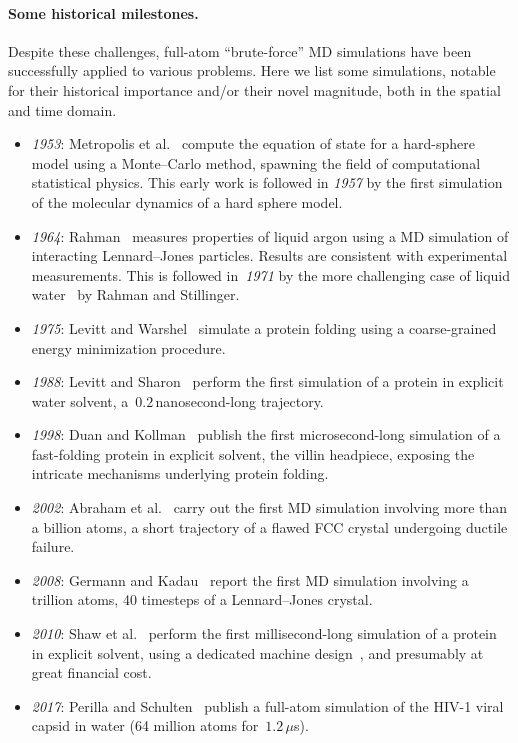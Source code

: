 \paragraph{Some historical milestones.}
\label{par:01:milestones}
Despite these challenges, full-atom ``brute-force'' MD simulations have been successfully applied to various problems. Here we list some simulations, notable for their historical importance and/or their novel magnitude, both in the spatial and time domain.
\begin{itemize}
    \item{\textit{1953}: Metropolis et al.~\cite{MRTT53} compute the equation of state for a hard-sphere model using a Monte--Carlo method, spawning the field of computational statistical physics. This early work is followed in \textit{1957} by the first simulation~\cite{AWal57} of the molecular dynamics of a hard sphere model.}
    \item{\textit{1964}: Rahman~\cite{R64} measures properties of liquid argon using a MD simulation of interacting Lennard--Jones particles. Results are consistent with experimental measurements. This is followed in~\textit{1971} by the more challenging case of liquid water~\cite{RS71} by Rahman and Stillinger.}
    \item{\textit{1975}: Levitt and Warshel~\cite{LW75} simulate a protein folding using a coarse-grained energy minimization procedure.}
    \item{\textit{1988}: Levitt and Sharon~\cite{LS88} perform the first simulation of a protein in explicit water solvent, a~$0.2$\,nanosecond-long trajectory.}
    \item{\textit{1998}: Duan and Kollman~\cite{DK98} publish the first microsecond-long simulation of a fast-folding protein in explicit solvent, the villin headpiece, exposing the intricate mechanisms underlying protein folding.}
    \item{\textit{2002}: Abraham et al.~\cite{AWGDDDLRS02} carry out the first MD simulation involving more than a billion atoms, a short trajectory of a flawed FCC crystal undergoing ductile failure.}
    \item{\textit{2008}: Germann and Kadau~\cite{GK08} report the first MD simulation involving a trillion atoms, 40 timesteps of a Lennard--Jones crystal.}
    \item{\textit{2010}: Shaw et al.~\cite{SMLLPDEBJSSal10} perform the first millisecond-long simulation of a protein in explicit solvent, using a dedicated machine design~\cite{SDDKLSYBBCal08}, and presumably at great financial cost.}
    \item{\textit{2017}: Perilla and Schulten~\cite{PS17} publish a full-atom simulation of the HIV-1 viral capsid in water (64 million atoms for~$1.2\,\mu$s).}
\end{itemize}

